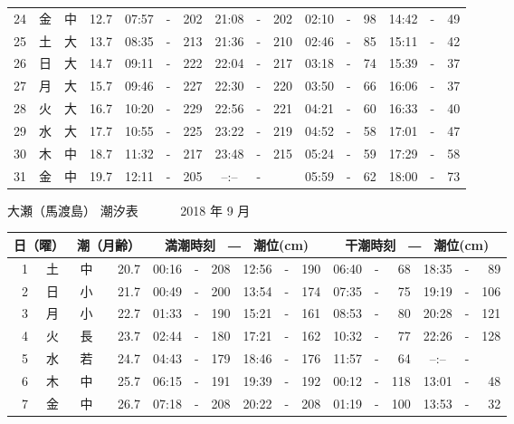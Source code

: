 \documentclass[12pt.a4j]{jsarticle}
\begin{document}
\begin{center}
\begin{table}[ht]
\begin{tabular}{|rc|cr|ccrccr|ccrccr|}
24 & 金 & 中 & 12.7 &  07:57 &-& 202  &  21:08 &-& 202  &   02:10 &-&  98  &   14:42 &-&  49  \\
25 & 土 & 大 & 13.7 &  08:35 &-& 213  &  21:36 &-& 210  &   02:46 &-&  85  &   15:11 &-&  42  \\
26 & 日 & 大 & 14.7 &  09:11 &-& 222  &  22:04 &-& 217  &   03:18 &-&  74  &   15:39 &-&  37  \\
27 & 月 & 大 & 15.7 &  09:46 &-& 227  &  22:30 &-& 220  &   03:50 &-&  66  &   16:06 &-&  37  \\
28 & 火 & 大 & 16.7 &  10:20 &-& 229  &  22:56 &-& 221  &   04:21 &-&  60  &   16:33 &-&  40  \\
29 & 水 & 大 & 17.7 &  10:55 &-& 225  &  23:22 &-& 219  &   04:52 &-&  58  &   17:01 &-&  47  \\
30 & 木 & 中 & 18.7 &  11:32 &-& 217  &  23:48 &-& 215  &   05:24 &-&  59  &   17:29 &-&  58  \\
31 & 金 & 中 & 19.7 &  12:11 &-& 205  &  --:-- &-&     &   05:59 &-&  62  &   18:00 &-&  73  \\
   \hline
   \end{tabular}
\end{table}
\newpage
 {\LARGE 大瀬（馬渡島）  潮汐表　　　}
 {\large 2018 年  9 月}\\
 \begin{table}[ht]
    \begin{tabular}{|rc|cr|ccrccr|ccrccr|}
    \hline
    \multicolumn{2}{|c|}{日（曜）} & \multicolumn{2}{c|}{潮（月齢）} & \multicolumn{6}{c|}{満潮時刻　―　潮位(cm)} & \multicolumn{6}{c|}{干潮時刻　―　潮位(cm)} \\
 \hline
 1 & 土 & 中 & 20.7 &  00:16 &-& 208  &  12:56 &-& 190  &   06:40 &-&  68  &   18:35 &-&  89  \\
 2 & 日 & 小 & 21.7 &  00:49 &-& 200  &  13:54 &-& 174  &   07:35 &-&  75  &   19:19 &-& 106  \\
 3 & 月 & 小 & 22.7 &  01:33 &-& 190  &  15:21 &-& 161  &   08:53 &-&  80  &   20:28 &-& 121  \\
 4 & 火 & 長 & 23.7 &  02:44 &-& 180  &  17:21 &-& 162  &   10:32 &-&  77  &   22:26 &-& 128  \\
 5 & 水 & 若 & 24.7 &  04:43 &-& 179  &  18:46 &-& 176  &   11:57 &-&  64  &   --:-- &-&     \\
 6 & 木 & 中 & 25.7 &  06:15 &-& 191  &  19:39 &-& 192  &   00:12 &-& 118  &   13:01 &-&  48  \\
 7 & 金 & 中 & 26.7 &  07:18 &-& 208  &  20:22 &-& 208  &   01:19 &-& 100  &   13:53 &-&  32  \\

\end{tabular}
\end{table}
\end{center}
\end{document}
